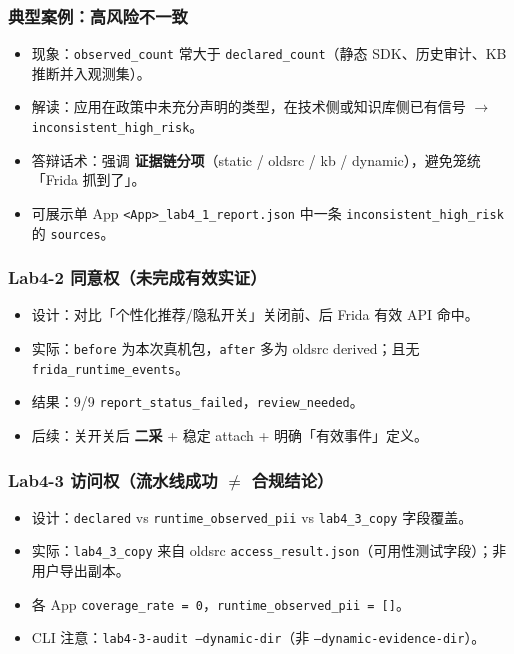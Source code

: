 \documentclass[AutoFakeBold,AutoFakeSlant]{beamer}
\begin{document}
\begin{frame}
    \frametitle{典型案例：高风险不一致}
    \small
    \begin{itemize}
        \item 现象：\texttt{observed\_count} 常大于 \texttt{declared\_count}（静态 SDK、历史审计、KB 推断并入观测集）。
        \item 解读：应用在政策中未充分声明的类型，在技术侧或知识库侧已有信号 $\rightarrow$ \texttt{inconsistent\_high\_risk}。
        \item 答辩话术：强调 \textbf{证据链分项}（static / oldsrc / kb / dynamic），避免笼统「Frida 抓到了」。
        \item 可展示单 App \texttt{<App>\_lab4\_1\_report.json} 中一条 \texttt{inconsistent\_high\_risk} 的 \texttt{sources}。
    \end{itemize}
\end{frame}

\begin{frame}
    \frametitle{Lab4-2 同意权（未完成有效实证）}
    \small
    \begin{itemize}
        \item 设计：对比「个性化推荐/隐私开关」关闭前、后 Frida 有效 API 命中。
        \item 实际：\texttt{before} 为本次真机包，\texttt{after} 多为 oldsrc derived；且无 \texttt{frida\_runtime\_events}。
        \item 结果：9/9 \texttt{report\_status\_failed}，\texttt{review\_needed}。
        \item 后续：关开关后 \textbf{二采} + 稳定 attach + 明确「有效事件」定义。
    \end{itemize}
\end{frame}

\begin{frame}
    \frametitle{Lab4-3 访问权（流水线成功 $\neq$ 合规结论）}
    \small
    \begin{itemize}
        \item 设计：\texttt{declared} vs \texttt{runtime\_observed\_pii} vs \texttt{lab4\_3\_copy} 字段覆盖。
        \item 实际：\texttt{lab4\_3\_copy} 来自 oldsrc \texttt{access\_result.json}（可用性测试字段）；非用户导出副本。
        \item 各 App \texttt{coverage\_rate = 0}，\texttt{runtime\_observed\_pii = []}。
        \item CLI 注意：\texttt{lab4-3-audit --dynamic-dir}（非 \texttt{--dynamic-evidence-dir}）。
    \end{itemize}
\end{frame}
\end{document}
